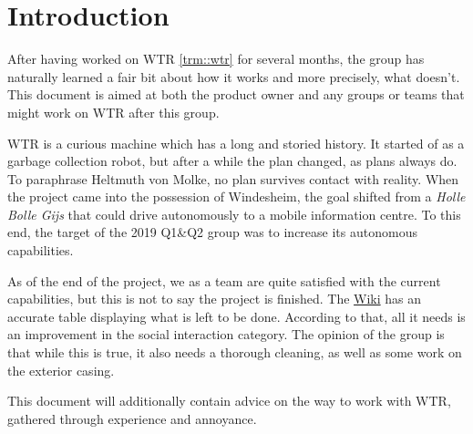 \section{Introduction}
\label{sec::intro}

After having worked on WTR \ref{trm::wtr} for several months, the group has naturally learned a fair bit about how it works and more precisely, what doesn't.
This document is aimed at both the product owner and any groups or teams that might work on WTR after this group.

WTR is a curious machine which has a long and storied history.
It started of as a garbage collection robot, but after a while the plan changed, as plans always do.
To paraphrase Heltmuth von Molke, no plan survives contact with reality.
When the project came into the possession of Windesheim, the goal shifted from a \textit{Holle Bolle Gijs} that could drive autonomously to a mobile information centre.
To this end, the target of the 2019 Q1\&Q2 group was to increase its autonomous capabilities.

As of the end of the project, we as a team are quite satisfied with the current capabilities, but this is not to say the project is finished.
The \href{https://windesheim-willy.github.io/WillyWiki/}{Wiki} has an accurate table displaying what is left to be done.
According to that, all it needs is an improvement in the social interaction category.
The opinion of the group is that while this is true, it also needs a thorough cleaning, as well as some work on the exterior casing.

This document will additionally contain advice on the way to work with WTR, gathered through experience and annoyance.
\newpage 